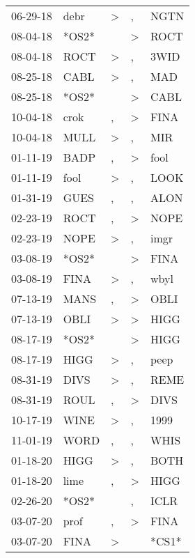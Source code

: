 \begin{supertabular}{lllll}
 06-29-18 &   debr &     \textgreater &                , &   NGTN \\
 08-04-18 &  *OS2* &                  &     \textgreater &   ROCT \\
 08-04-18 &   ROCT &     \textgreater &                , &   3WID \\
 08-25-18 &   CABL &     \textgreater &                , &    MAD \\
 08-25-18 &  *OS2* &                  &     \textgreater &   CABL \\
 10-04-18 &   crok &                , &     \textgreater &   FINA \\
 10-04-18 &   MULL &     \textgreater &                , &    MIR \\
 01-11-19 &   BADP &                , &     \textgreater &   fool \\
 01-11-19 &   fool &     \textgreater &                , &   LOOK \\
 01-31-19 &   GUES &                , &                , &   ALON \\
 02-23-19 &   ROCT &                , &     \textgreater &   NOPE \\
 02-23-19 &   NOPE &     \textgreater &                , &   imgr \\
 03-08-19 &  *OS2* &                  &     \textgreater &   FINA \\
 03-08-19 &   FINA &     \textgreater &                , &   wbyl \\
 07-13-19 &   MANS &                , &     \textgreater &   OBLI \\
 07-13-19 &   OBLI &     \textgreater &     \textgreater &   HIGG \\
 08-17-19 &  *OS2* &                  &     \textgreater &   HIGG \\
 08-17-19 &   HIGG &     \textgreater &                , &   peep \\
 08-31-19 &   DIVS &     \textgreater &                , &   REME \\
 08-31-19 &   ROUL &                , &     \textgreater &   DIVS \\
 10-17-19 &   WINE &     \textgreater &                , &   1999 \\
 11-01-19 &   WORD &                , &                , &   WHIS \\
 01-18-20 &   HIGG &     \textgreater &                , &   BOTH \\
 01-18-20 &   lime &                , &     \textgreater &   HIGG \\
 02-26-20 &  *OS2* &                  &                , &   ICLR \\
 03-07-20 &   prof &                , &     \textgreater &   FINA \\
 03-07-20 &   FINA &     \textgreater &                  &  *CS1* \\
\end{supertabular}
